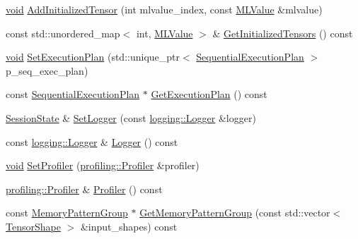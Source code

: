 \begin{DoxyCompactItemize}
\item 
\mbox{\hyperlink{mlasi_8h_a88f941d423cb2a819b70a1358982b1a6}{void}} \mbox{\hyperlink{classonnxruntime_1_1SessionState_a042cc35f37efe8e514d3079a3057b4bc}{Add\+Initialized\+Tensor}} (int mlvalue\+\_\+index, const \mbox{\hyperlink{classonnxruntime_1_1MLValue}{M\+L\+Value}} \&mlvalue)
\item 
const std\+::unordered\+\_\+map$<$ int, \mbox{\hyperlink{classonnxruntime_1_1MLValue}{M\+L\+Value}} $>$ \& \mbox{\hyperlink{classonnxruntime_1_1SessionState_af517e5b1c5802615d61097bc2dac794c}{Get\+Initialized\+Tensors}} () const
\item 
\mbox{\hyperlink{mlasi_8h_a88f941d423cb2a819b70a1358982b1a6}{void}} \mbox{\hyperlink{classonnxruntime_1_1SessionState_a3f028fc934024bfefa2de97c9616f325}{Set\+Execution\+Plan}} (std\+::unique\+\_\+ptr$<$ \mbox{\hyperlink{structonnxruntime_1_1SequentialExecutionPlan}{Sequential\+Execution\+Plan}} $>$ p\+\_\+seq\+\_\+exec\+\_\+plan)
\item 
const \mbox{\hyperlink{structonnxruntime_1_1SequentialExecutionPlan}{Sequential\+Execution\+Plan}} $\ast$ \mbox{\hyperlink{classonnxruntime_1_1SessionState_ad10a1a643c133246a05014b0ece064f3}{Get\+Execution\+Plan}} () const
\item 
\mbox{\hyperlink{classonnxruntime_1_1SessionState}{Session\+State}} \& \mbox{\hyperlink{classonnxruntime_1_1SessionState_ac285bca58766bb80fa922aaeba828621}{Set\+Logger}} (const \mbox{\hyperlink{classonnxruntime_1_1logging_1_1Logger}{logging\+::\+Logger}} \&logger)
\item 
const \mbox{\hyperlink{classonnxruntime_1_1logging_1_1Logger}{logging\+::\+Logger}} \& \mbox{\hyperlink{classonnxruntime_1_1SessionState_af88e64c9cb77a0015935769ff1ec80c2}{Logger}} () const
\item 
\mbox{\hyperlink{mlasi_8h_a88f941d423cb2a819b70a1358982b1a6}{void}} \mbox{\hyperlink{classonnxruntime_1_1SessionState_ad15420b0775627e972dca83112970ab9}{Set\+Profiler}} (\mbox{\hyperlink{classonnxruntime_1_1profiling_1_1Profiler}{profiling\+::\+Profiler}} \&profiler)
\item 
\mbox{\hyperlink{classonnxruntime_1_1profiling_1_1Profiler}{profiling\+::\+Profiler}} \& \mbox{\hyperlink{classonnxruntime_1_1SessionState_ab7485b490fd94087096dcb7768bca814}{Profiler}} () const
\item 
const \mbox{\hyperlink{structonnxruntime_1_1MemoryPatternGroup}{Memory\+Pattern\+Group}} $\ast$ \mbox{\hyperlink{classonnxruntime_1_1SessionState_a66e34a4a6a9c5262f36a33e357122421}{Get\+Memory\+Pattern\+Group}} (const std\+::vector$<$ \mbox{\hyperlink{classonnxruntime_1_1TensorShape}{Tensor\+Shape}} $>$ \&input\+\_\+shapes) const

\end{DoxyCompactItemize}
